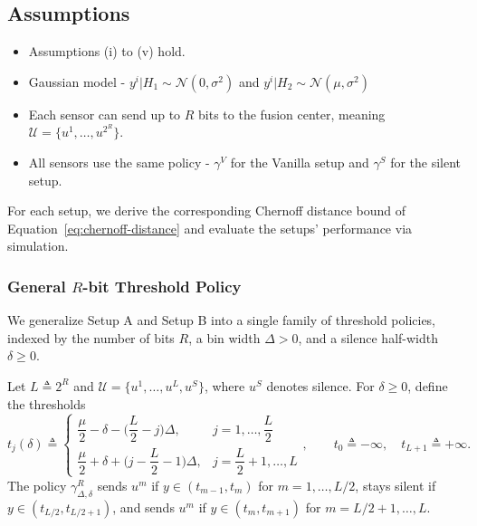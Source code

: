 \documentclass[11pt]{article}
\begin{document}
\subsection*{Assumptions}
\begin{itemize}
    \item Assumptions (i) to (v) hold.
    \item Gaussian model - $y^i|H_1 \sim \mathcal{N}(0,\sigma^2)$ and $y^i|H_2 \sim \mathcal{N}(\mu,\sigma^2)$
        \begin{figure}[h!]
            \centering
        \end{figure}
    \item Each sensor can send up to $R$ bits to the fusion center, meaning $\mathcal{U} = \{u^1,\dots, u^{2^R}\}$.
    \item All sensors use the same policy - $\gamma^V$ for the Vanilla setup and $\gamma^S$ for the silent setup.
\end{itemize}
For each setup, we derive the corresponding Chernoff distance bound of Equation~\eqref{eq:chernoff-distance} and evaluate the setups' performance via simulation.


\subsubsection*{General $R$-bit Threshold Policy}
 
We generalize Setup A and Setup B into a single family of threshold
policies, indexed by the number of bits $R$, a bin width $\Delta>0$, and
a silence half-width $\delta \ge 0$.
 
Let $L \triangleq 2^R$ and $\mathcal{U} = \{u^1,\dots,u^L,u^S\}$, where
$u^S$ denotes silence. For $\delta \ge 0$, define the thresholds
\begin{equation}
t_j(\delta) \triangleq
\begin{cases}
\dfrac{\mu}{2} - \delta - \Big(\dfrac{L}{2}-j\Big)\Delta, & j = 1,\dots,\dfrac{L}{2} \\[2mm]
\dfrac{\mu}{2} + \delta + \Big(j-\dfrac{L}{2}-1\Big)\Delta, & j = \dfrac{L}{2}+1,\dots,L
\end{cases},
\qquad t_0 \triangleq -\infty, \quad t_{L+1} \triangleq +\infty.
\label{eq:general-thresholds}
\end{equation}
The policy $\gamma^R_{\Delta,\delta}$ sends $u^m$ if $y \in (t_{m-1},t_m)$
for $m=1,\dots,L/2$, stays silent if $y \in (t_{L/2},t_{L/2+1})$, and
sends $u^m$ if $y \in (t_m,t_{m+1})$ for $m=L/2+1,\dots,L$.
 
\end{document}
